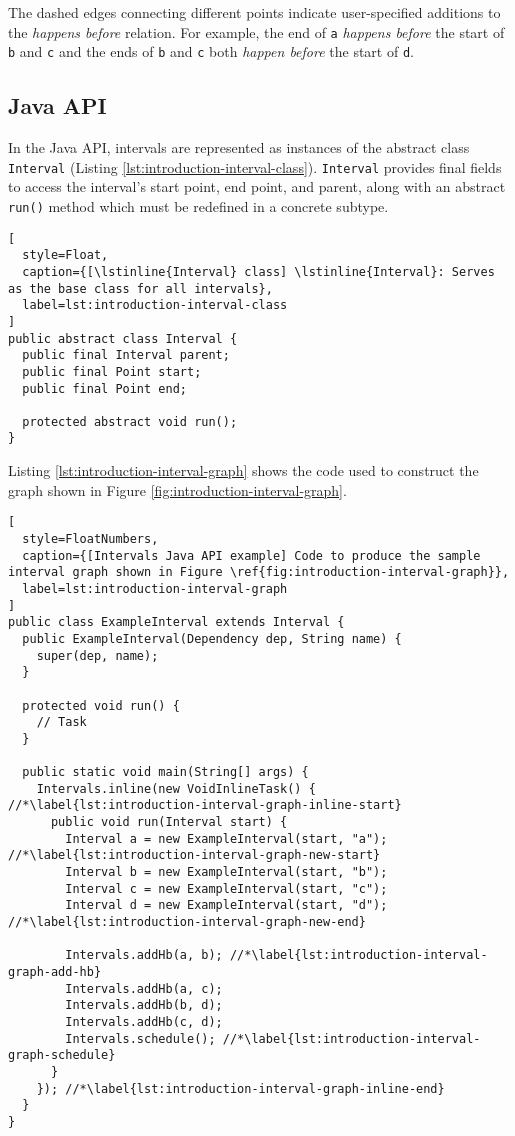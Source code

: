 The dashed edges connecting different points indicate user-specified
additions to the \emph{happens before} relation. For example, the end
of \lstinline!a! \emph{happens before} the start of \lstinline!b! and
\lstinline!c! and the ends of \lstinline!b! and \lstinline!c! both
\emph{happen before} the start of \lstinline!d!.

\subsection{Java API}
\label{sec:intro-intervals-java-api}

In the Java API, intervals are represented as instances of the
abstract class \lstinline!Interval! (Listing
\ref{lst:introduction-interval-class}). \lstinline!Interval! provides final fields
to access the interval's start point, end point, and parent, along
with an abstract \lstinline!run()! method which must be redefined in a
concrete subtype.

\begin{lstlisting}[
  style=Float, 
  caption={[\lstinline{Interval} class] \lstinline{Interval}: Serves as the base class for all intervals},
  label=lst:introduction-interval-class
]
public abstract class Interval {
  public final Interval parent;
  public final Point start;
  public final Point end;

  protected abstract void run();
}
\end{lstlisting}

Listing \ref{lst:introduction-interval-graph} shows the code used to construct the
graph shown in Figure \ref{fig:introduction-interval-graph}.

\begin{lstlisting}[
  style=FloatNumbers, 
  caption={[Intervals Java API example] Code to produce the sample interval graph shown in Figure \ref{fig:introduction-interval-graph}},
  label=lst:introduction-interval-graph
]
public class ExampleInterval extends Interval {
  public ExampleInterval(Dependency dep, String name) {
    super(dep, name);
  }
  
  protected void run() {
    // Task
  }
  
  public static void main(String[] args) {
    Intervals.inline(new VoidInlineTask() { //*\label{lst:introduction-interval-graph-inline-start}
      public void run(Interval start) {
        Interval a = new ExampleInterval(start, "a"); //*\label{lst:introduction-interval-graph-new-start}
        Interval b = new ExampleInterval(start, "b");
        Interval c = new ExampleInterval(start, "c");
        Interval d = new ExampleInterval(start, "d"); //*\label{lst:introduction-interval-graph-new-end}
        
        Intervals.addHb(a, b); //*\label{lst:introduction-interval-graph-add-hb}
        Intervals.addHb(a, c);
        Intervals.addHb(b, d);
        Intervals.addHb(c, d);
        Intervals.schedule(); //*\label{lst:introduction-interval-graph-schedule}
      }
    }); //*\label{lst:introduction-interval-graph-inline-end}
  }
}
\end{lstlisting}

